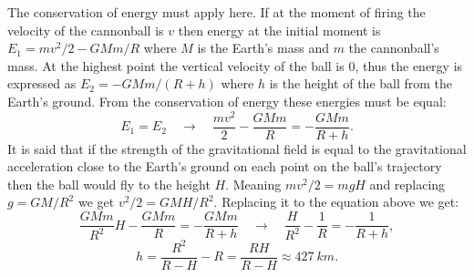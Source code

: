 \documentclass[11pt]{article}
\begin{document}
\solueng
The conservation of energy must apply here. If at the moment of firing the velocity of the cannonball is $v$ then energy at the initial moment is $E_1 = mv^2/2 - GMm/R$ where $M$ is the Earth’s mass and $m$ the cannonball’s mass. At the highest point the vertical velocity of the ball is 0, thus the energy is expressed as $E_2 = -GMm/(R+h)$ where $h$ is the height of the ball from the Earth’s ground. From the conservation of energy these energies must be equal:
$$E_1 = E_2 \quad\rightarrow\quad \frac{mv^2}{2} - \frac{GMm}{R} = -\frac{GMm}{R+h}.$$
It is said that if the strength of the gravitational field is equal to the gravitational acceleration close to the Earth’s ground on each point on the ball’s trajectory then the ball would fly to the height $H$. Meaning $mv^2/2=mgH$ and replacing $g=GM/R^2$ we get $v^2/2=GMH/R^2$. Replacing it to the equation above we get:
$$\frac{GMm}{R^2}H - \frac{GMm}{R} = -\frac{GMm}{R+h} \quad\rightarrow\quad \frac{H}{R^2}-\frac{1}{R} = - \frac{1}{R+h},$$
$$h=\frac{R^2}{R-H} - R = \frac{RH}{R-H} \approx \SI{427}{km}.$$
\probend
\bigskip

\end{document}
